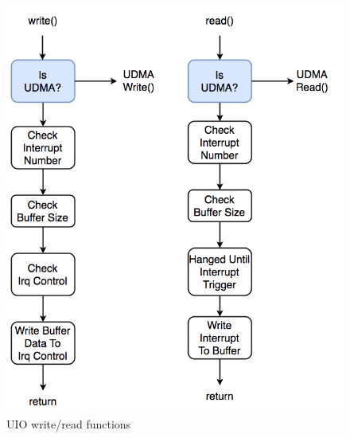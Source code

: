 \begin{figure}[!htb]
  \centering
  \includegraphics[scale=0.5]{images/udma_func_entry.png}
  \caption[UIO write/read functions.]{UIO write/read functions}
  \label{fig:UIO write andread functions.}
\end{figure}

